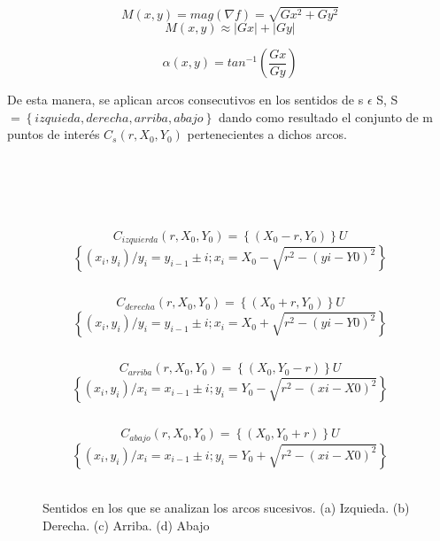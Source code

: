 \[
M(x,y) = mag(\nabla f) = \sqrt{Gx^{2} + Gy^{2}}
\]
\[
M(x,y) \approx \left | Gx \right | + \left | Gy \right |
\]

\[
\alpha(x,y) = tan^{-1} \left ( \frac{Gx}{Gy} \right )
\]

\begin{table}[htbp]
\begin{center}
\end{center}
\end{table}

De esta manera, se aplican arcos consecutivos en los sentidos  de s $\epsilon$ S, S $ = \left \{ \left. izquieda, derecha, arriba, abajo \right \} \right.$ dando como resultado el conjunto de m puntos de interés $C_{s}(r, X_{0}, Y_{0})$ pertenecientes a dichos arcos. \\ \\ \\ \\ \\ \\ 

\[
 C_{izquierda}(r, X_{0}, Y_{0}) = \left \{( X_{0} - r,Y_{0}) \right \} U
\]
\[
  \left \{( x_{i},y_{i})/y_{i} = y_{i-1} \pm i; x_{i} = X_{0} - \sqrt{r^{2} - (y{i} - Y{0})^{2}}  \right \} 
\]

\[
\]

\[
 C_{derecha}(r, X_{0}, Y_{0}) = \left \{( X_{0} + r,Y_{0}) \right \} U
\]
\[
  \left \{( x_{i},y_{i})/y_{i} = y_{i-1} \pm i; x_{i} = X_{0} + \sqrt{r^{2} - (y{i} - Y{0})^{2}}  \right \} 
\]

\[
\]

\[
 C_{arriba}(r, X_{0}, Y_{0}) = \left \{( X_{0},Y_{0}-r) \right \} U
\]
\[
  \left \{( x_{i},y_{i})/x_{i} = x_{i-1} \pm i; y_{i} = Y_{0} - \sqrt{r^{2} - (x{i} - X{0})^{2}}  \right \} 
\]

\[
\]

\[
 C_{abajo}(r, X_{0}, Y_{0}) = \left \{( X_{0},Y_{0}+r) \right \} U
\]
\[
  \left \{( x_{i},y_{i})/x_{i} = x_{i-1} \pm i; y_{i} = Y_{0} + \sqrt{r^{2} - (x{i} - X{0})^{2}}  \right \} 
\] \\ 

\begin{figure}[htbp]
\centering
{}
\caption{Sentidos en los que se analizan los arcos sucesivos. (a) Izquieda. (b) Derecha. (c) Arriba. (d) Abajo} \label{fig:señales}
\end{figure}

